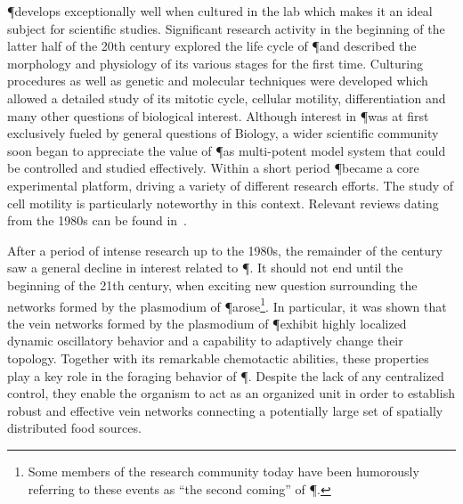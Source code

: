 		\P develops exceptionally well when cultured in the lab which makes it an ideal subject for scientific studies. Significant research activity in the beginning of the latter half of the 20th century explored the life cycle of \P and described the morphology and physiology of its various stages for the first time. Culturing procedures as well as genetic and molecular techniques were developed which allowed a detailed study of its mitotic cycle, cellular motility, differentiation and many other questions of biological interest. Although interest in \P was at first exclusively fueled by general questions of Biology, a wider scientific community soon began to appreciate the value of \P as multi-potent model system that could be controlled and studied effectively. Within a short period \P became a core experimental platform, driving a variety of different research efforts. The study of cell motility is particularly noteworthy in this context. Relevant reviews dating from the 1980s can be found in~\cite{dove1980growth, aldrich2012cell,sauer1982developmental,Sauer1986}.

		After a period of intense research up to the 1980s, the remainder of the century saw a general decline in interest related to \P. It should not end until the beginning of the 21th century, when exciting new question surrounding the networks formed by the plasmodium of \P arose\footnote{Some members of the research community today have been humorously referring to these events as ``the second coming'' of \P.}. In particular, it was shown that the vein networks formed by the plasmodium of \P exhibit highly localized dynamic oscillatory behavior and a capability to adaptively change their topology. Together with its remarkable chemotactic abilities, these properties play a key role in the foraging behavior of \P. Despite the lack of any centralized control, they enable the organism to act as an organized unit in order to establish robust and effective vein networks connecting a potentially large set of spatially distributed food sources. 

